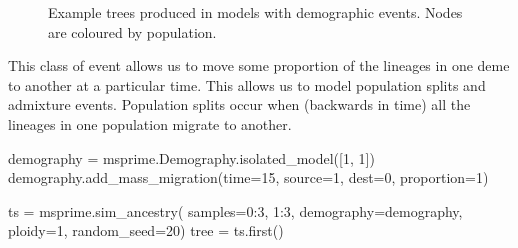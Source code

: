 \documentclass[graybox]{svmult}
\begin{document}
\begin{figure}[t]
\centering
{}
{}
{}
\caption{\label{fig-trees-demographic-events} Example trees produced in models
with demographic events. Nodes are coloured by population.}
\end{figure}


\label{mass-migration}

This class of event allows us to move some proportion of the lineages in
one deme to another at a particular time. This allows us to model
population splits and admixture events. Population splits occur
when (backwards in time) all the lineages in one population migrate to
another.

\begin{pythoncode}
demography = msprime.Demography.isolated_model([1, 1])
demography.add_mass_migration(time=15, source=1, dest=0, proportion=1)

ts  = msprime.sim_ancestry(
    samples={0:3, 1:3},
    demography=demography,
    ploidy=1,
    random_seed=20)
tree = ts.first()
\end{pythoncode}
\end{document}
